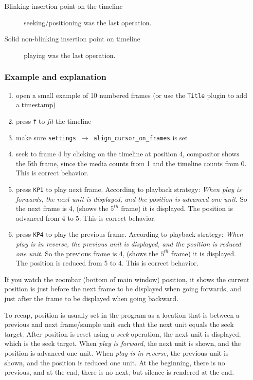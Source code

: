 \begin{description}
    \item[Blinking insertion point on the timeline] seeking/positioning was the last operation.
    \item[Solid non-blinking insertion point on timeline] playing was the last operation.
\end{description}

\subsubsection*{Example and explanation}%
\label{ssub:example_explanation}

\begin{enumerate}
    \item open a small example of 10 numbered frames (or use the \texttt{Title} plugin to add a timestamp)
    \item press \texttt{f} to \textit{fit} the timeline
    \item make sure \texttt{settings $\rightarrow$ align\_cursor\_on\_frames} is set
    \item seek to frame 4 by clicking on the timeline at position 4, compositor shows the 5th frame, since the
    media counts from 1 and the timeline counts from 0.  This is correct behavior.
    \item press \texttt{KP1} to play next frame.  According to playback strategy: \textit{When play is forwards, the next unit is displayed, and the position is advanced one unit}. So the next frame is 4, (shows the $5^{th}$ frame) it is displayed. The position is advanced from 4 to 5.  This is correct behavior.
    \item press \texttt{KP4} to play the previous frame. According to playback strategy: \textit{When play is in reverse, the previous unit is displayed, and the position is reduced one unit}. So the previous frame is 4, (shows the $5^{th}$ frame) it is displayed. The position is reduced from 5 to 4. This is correct behavior.
\end{enumerate}

If you watch the zoombar (bottom of main window) position, it shows the current position is just before the next frame to be displayed when going forwards, and just after the frame to be displayed when going backward.

To recap, position is usually set in the program as a location that is between a previous and next frame/sample unit such that the next unit equals the seek target.  After position is reset using a \textit{seek} operation, the next unit is displayed, which is the seek target.  When \textit{play is forward}, the next unit is shown, and the position is advanced one unit.  When \textit{play is in reverse}, the previous unit is shown, and the position is reduced one unit.  At the beginning, there is no previous, and at the end, there is no next, but silence is rendered at the end.

